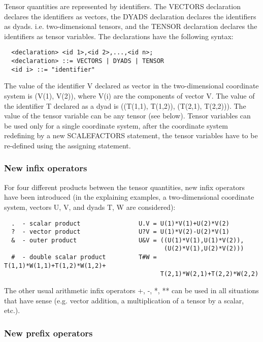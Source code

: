      Tensor  quantities  are  represented  by  identifiers.  The VECTORS
declaration declares  the identifiers  as vectors, the DYADS declaration
declares the identifiers as dyads. i.e. two-dimensional tensors, and the
TENSOR  declaration  declares  the  identifiers as tensor variables. The
declarations have the following syntax:
\begin{verbatim}
  <declaration> <id 1>,<id 2>,...,<id n>;
  <declaration> ::= VECTORS | DYADS | TENSOR
  <id i> ::= "identifier"
\end{verbatim}
The value of the identifier V declared as vector in  the two-dimensional
coordinate  system  is  (V(1),  V(2)),  where V(i) are the components of
vector V. The value of the identifier T declared as a dyad  is ((T(1,1),
T(1,2)), (T(2,1),  T(2,2))). The value of the tensor variable can be any
tensor (see below). Tensor variables  can  be  used  only  for  a single
coordinate  system,  after  the  coordinate  system  redefining by a new
SCALEFACTORS statement, the tensor variables have to be re-defined using
the assigning statement.


\subsubsection{New infix operators}


     For  four  different  products  between  the tensor quantities, new
infix operators have been  introduced  (in  the  explaining  examples, a
two-dimensional  coordinate  system,  vectors  U,  V, and dyads T, W are
considered):
\begin{verbatim}
  .  - scalar product                U.V = U(1)*V(1)+U(2)*V(2)
  ?  - vector product                U?V = U(1)*V(2)-U(2)*V(1)
  &  - outer product                 U&V = ((U(1)*V(1),U(1)*V(2)),
                                            (U(2)*V(1),U(2)*V(2)))
  #  - double scalar product         T#W = T(1,1)*W(1,1)+T(1,2)*W(1,2)+
                                           T(2,1)*W(2,1)+T(2,2)*W(2,2)
\end{verbatim}
The other usual arithmetic infix operators +, -,  *, **  can be  used in
all situations  that have  sense (e.g. vector addition, a multiplication
of a tensor by a scalar, etc.).


\subsubsection{New prefix operators}

